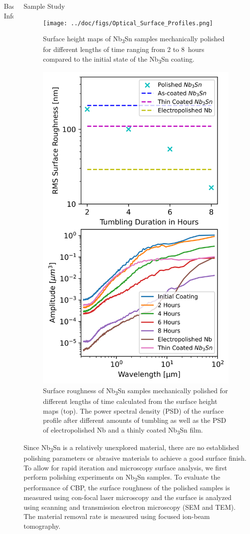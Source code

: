 \documentclass{beamer}
\begin{document}
\begin{frame}{}
\begin{columns}[t]
\begin{column}{0.32\linewidth}
\begin{columns}[t]
\begin{block}{\label{sec:backgroundinformation}Background Information}
\begin{column}{0.45\columnwidth}
\begin{figure}[t]
                                \label{fig:couponcavity}%
                            \end{figure}
                        \end{column}
                    \end{block}
                \end{columns}
            \end{column}
            \begin{column}{0.32\linewidth}    
                \begin{block}{\label{sec:samplestudy}Sample Study}
                    \begin{figure}
                        \centering
                        \texttt{[image: ../doc/figs/Optical\_Surface\_Profiles.png]}
                        \caption{\label{fig:opticalsurfaceprofiles}Surface height maps of Nb\textsubscript{3}Sn samples mechanically polished for different lengths of time ranging from 2 to 8~hours compared to the initial state of the Nb\textsubscript{3}Sn coating.}
                        \includegraphics[width=0.3\columnwidth]{../doc/figs/Surface_Roughness_Graph.png}
                        \caption{\label{fig:surfaceroughnessgraph}Surface roughness of Nb\textsubscript{3}Sn samples mechanically polished for different lengths of time calculated from the surface height maps (top). The power spectral density (PSD) of the surface profile after different amounts of tumbling as well as the PSD of electropolished Nb and a thinly coated Nb\textsubscript{3}Sn film.}
                    \end{figure}
                    Since Nb\textsubscript{3}Sn is a relatively unexplored material, there are no established polishing parameters or abrasive materials to achieve a good surface finish. To allow for rapid iteration and microscopy surface analysis, we first perform polishing experiments on Nb\textsubscript{3}Sn samples. To evaluate the performance of CBP, the surface roughness of the polished samples is measured using con-focal laser microscopy and the surface is analyzed using scanning and transmission electron microscopy (SEM and TEM). The material removal rate is measured using focused ion-beam tomography.

\end{block}
\end{column}
\end{columns}
\end{frame}
\end{document}
